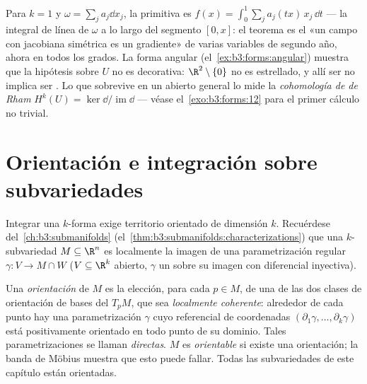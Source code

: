 \begin{remark}
Para $k = 1$ y $\omega = \sum_j a_j\dd x_j$, la primitiva es
$f(x) = \int_0^1\sum_ja_j(tx)\,x_j\,\dd t$ --- la integral de línea de
$\omega$ a lo largo del segmento $[0, x]$: el teorema es el «un campo
con jacobiana simétrica es un gradiente» de varias variables de segundo
año, ahora en todos los grados. La forma angular
(el~\cref{ex:b3:forms:angular}) muestra que la hipótesis sobre $U$ no es
decorativa: $\R^2\setminus\{0\}$ no es estrellado, y allí ser  no
implica ser . Lo que sobrevive en un
abierto general lo mide la
\emph{cohomología de de Rham} $H^k(U) =
\ker\dd/\operatorname{im}\dd$ --- véase el~\cref{exo:b3:forms:12} para
el primer cálculo no trivial.
\end{remark}

\section{Orientación e integración sobre subvariedades}

Integrar una $k$-forma exige territorio orientado de dimensión $k$.
Recuérdese del~\cref{ch:b3:submanifolds}
(el~\cref{thm:b3:submanifolds:characterizations}) que una
$k$-subvariedad $M \subseteq \R^n$ es localmente la imagen de una
parametrización regular $\gamma\colon V \to M \cap W$ ($V
\subseteq \R^k$ abierto, $\gamma$ un
 sobre su imagen con
diferencial inyectiva).

\begin{definition}\label{def:b3:forms:orientation}
Una \emph{orientación} de $M$ es la elección, para
cada $p \in M$, de una de las dos clases de orientación de bases del
 $T_pM$, que sea
\emph{localmente coherente}: alrededor de cada punto hay una
parametrización $\gamma$ cuyo referencial de coordenadas
$(\partial_1\gamma, \dots,
\partial_k\gamma)$ está positivamente orientado en todo punto de su
dominio. Tales parametrizaciones se llaman \emph{directas}. $M$ es
\emph{orientable} si existe una orientación; la banda de Möbius muestra
que esto puede fallar. Todas las subvariedades de este capítulo están
orientadas.
\end{definition}


